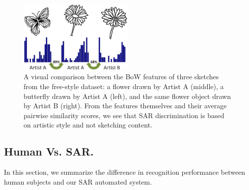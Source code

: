 


\begin{figure}[ht]
  \centering
  \includegraphics[width=0.5\textwidth]{images/styleVsContent2.png}
  \caption{A visual comparison between the BoW features of three sketches from the free-style dataset: a flower drawn by Artist A (middle), a butterfly drawn by Artist A (left), and the same flower object drawn by Artist B (right). From the features themselves and their average pairwise similarity scores, we see that SAR discrimination is based on artistic style and not sketching content.}
  \label{styleVsContent}
\end{figure}


\iffalse
\subsection{Human Vs. SAR.}
In this section, we summarize the difference in recognition performance between human subjects and our SAR automated system.

